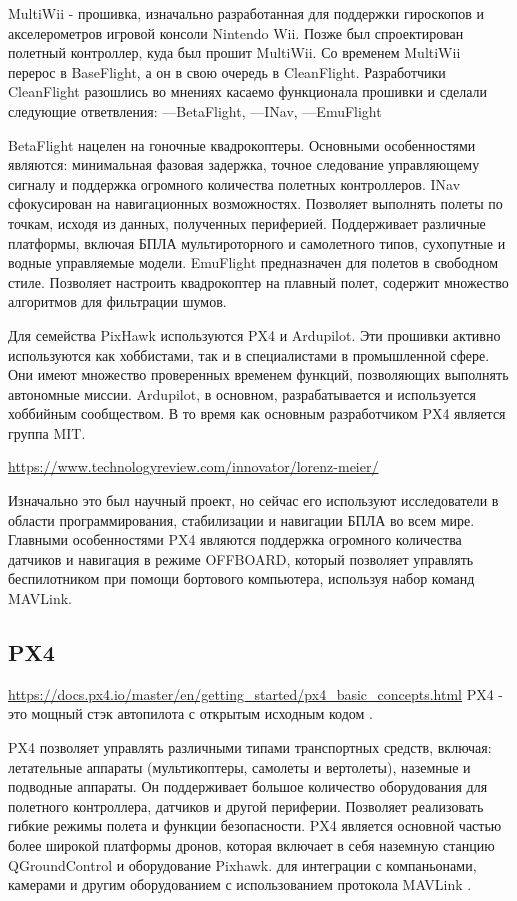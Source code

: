 MultiWii - прошивка, изначально разработанная для поддержки гироскопов и акселерометров игровой консоли Nintendo Wii. Позже был спроектирован полетный контроллер, куда был прошит MultiWii. Со временем MultiWii перерос в BaseFlight, а он в свою очередь в CleanFlight. Разработчики CleanFlight разошлись во мнениях касаемо функционала прошивки и сделали следующие ответвления:
---BetaFlight,
---INav,
---EmuFlight


BetaFlight нацелен на гоночные квадрокоптеры. Основными особенностями являются: минимальная фазовая задержка, точное следование управляющему сигналу и поддержка огромного количества полетных контроллеров.
INav сфокусирован на навигационных возможностях. Позволяет выполнять полеты по точкам, исходя из данных, полученных периферией. Поддерживает различные платформы, включая БПЛА мультироторного и самолетного типов, сухопутные и водные управляемые модели.
EmuFlight предназначен для полетов в свободном стиле. Позволяет настроить квадрокоптер на плавный полет, содержит множество алгоритмов для фильтрации шумов.

Для семейства PixHawk используются PX4 и Ardupilot. Эти прошивки активно используются как хоббистами, так и в специалистами в промышленной сфере. Они имеют множество проверенных временем функций, позволяющих выполнять автономные миссии. Ardupilot, в основном, разрабатывается и используется хоббийным сообществом. В то время как основным разработчиком PX4 является группа MIT.

\url{https://www.technologyreview.com/innovator/lorenz-meier/}

Изначально это был научный проект, но сейчас его используют исследователи в области программирования, стабилизации и навигации БПЛА во всем мире.
Главными особенностями PX4 являются поддержка огромного количества датчиков и навигация в режиме OFFBOARD, который позволяет управлять беспилотником при помощи бортового компьютера, используя набор команд MAVLink.


\subsection{PX4}
\url{https://docs.px4.io/master/en/getting_started/px4_basic_concepts.html}
PX4 - это мощный стэк автопилота с открытым исходным кодом .

PX4 позволяет управлять различными типами транспортных средств, включая: летательные аппараты (мультикоптеры, самолеты и вертолеты), наземные и подводные аппараты. Он поддерживает большое количество оборудования для полетного контроллера, датчиков и другой периферии.
Позволяет реализовать гибкие режимы полета и функции безопасности.
PX4 является основной частью более широкой платформы дронов, которая включает в себя наземную станцию QGroundControl и оборудование Pixhawk. для интеграции с компаньонами, камерами и другим оборудованием с использованием протокола MAVLink
. 

